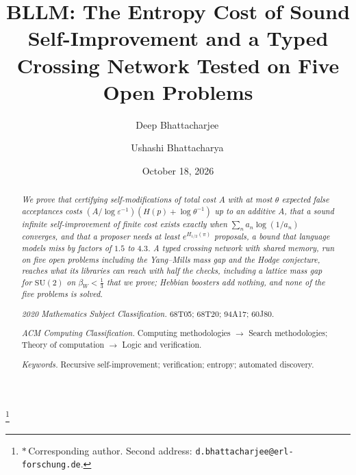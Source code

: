 \documentclass[aps,prd,twocolumn,superscriptaddress,nofootinbib,longbibliography,floatfix,amsmath,amssymb,10pt]{revtex4-2}
\theoremstyle{plain}
\theoremstyle{definition}
\theoremstyle{plain}
\newcommand{\eps}{\varepsilon}
\begin{document}
\title{BLLM: The Entropy Cost of Sound Self-Improvement and a Typed Crossing Network Tested on Five Open Problems}

\author{Deep Bhattacharjee\,}
\thanks{$*$\,Corresponding author. Second address: \nolinkurl{d.bhattacharjee@erl-forschung.de}.}

\author{Ushashi Bhattacharya\,}

\date{October 18, 2026}

\begin{abstract}
\itshape
We prove that certifying self-modifications of total cost $A$ with at most $\theta$ expected false acceptances costs $(A/\log\eps^{-1})(H(p)+\log\theta^{-1})$ up to an additive $A$, that a sound infinite self-improvement of finite cost exists exactly when $\sum_{n}a_{n}\log(1/a_{n})$ converges, and that a proposer needs at least $e^{H_{1/2}(\pi)}$ proposals, a bound that language models miss by factors of $1.5$ to $4.3$. A typed crossing network with shared memory, run on five open problems including the Yang--Mills mass gap and the Hodge conjecture, reaches what its libraries can reach with half the checks, including a lattice mass gap for $\mathrm{SU}(2)$ on $\beta_{W}<\frac13$ that we prove; Hebbian boosters add nothing, and none of the five problems is solved.
\par\medskip\upshape\noindent\textit{2020 Mathematics Subject Classification.} 68T05; 68T20; 94A17; 60J80.\par\smallskip\noindent\textit{ACM Computing Classification.} Computing methodologies $\to$ Search methodologies; Theory of computation $\to$ Logic and verification.\par\smallskip\noindent\textit{Keywords.} Recursive self-improvement; verification; entropy; automated discovery.
\end{abstract}


\maketitle
\makeatletter\renewcommand\l@subsection[2]{}\renewcommand\l@subsubsection[2]{}\makeatother
\tableofcontents
\end{document}
